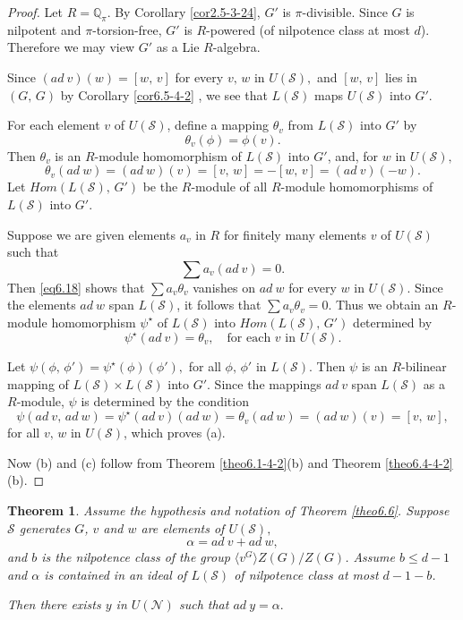\documentclass[mathscr]{amsart}
\theoremstyle{theorem}
\newtheorem{theorem}{Theorem}[section]
\theoremstyle{definition}
\numberwithin{equation}{section}
\def\Q{\mathbb{Q}}
\def\S{\mathcal{S}}
\begin{document}
\begin{proof}
Let $R=\Q_\pi$. By Corollary \ref{cor2.5-3-24}, $G'$ is
$\pi$-divisible. Since $G$ is nilpotent and $\pi$-torsion-free, $G'$
is $R$-powered (of nilpotence class at most $d$). Therefore we may
view $G'$ as a Lie $R$-algebra.

Since $(ad\ v)(w)=[w,\,v]$ for every $v,\,w$ in $U(\S),$ and
$[w,\,v]$ lies in $(G,\,G)$ by Corollary \ref{cor6.5-4-2} , we see
that $L(\S)$ maps $U(\S)$ into $G'.$

For each element $v$ of $U(\S)$, define a mapping $\theta_v$ from
$L(\S)$ into $G'$ by
$$\theta_v(\phi)=\phi(v).$$
Then $\theta_v$ is an $R$-module homomorphism of $L(\S)$ into $G'$,
and, for $w$ in $U(\S),$
\begin{equation}\label{eq6.18}
\theta_v(ad\ w)=(ad\ w)(v)=[v,\,w]=-[w,\,v]=(ad\ v)(-w).
\end{equation}
Let $Hom(L(\S),\,G')$ be the $R$-module of all $R$-module
homomorphisms of $L(\S)$ into $G'.$

Suppose we are given elements $a_v$ in $R$ for finitely many
elements $v$ of $U(\S)$ such that
$$\sum a_v(ad\ v)=0.$$
Then \eqref{eq6.18} shows that $\sum a_v\theta_v$ vanishes on $ad\
w$ for every $w$ in $U(\S)$. Since the elements $ad\ w$ span
$L(\S)$, it follows that $\sum a_v\theta_v=0$. Thus we obtain an
$R$-module homomorphism $\psi^\star$ of $L(\S)$ into
$Hom(L(\S),\,G')$ determined by
$$\psi^\star(ad\ v)=\theta_v,\quad\text{for each $v$ in }U(\S).$$

Let $\psi(\phi,\,\phi')=\psi^\star(\phi)(\phi'),$ for all
$\phi,\,\phi'$ in $L(\S).$ Then $\psi$ is an $R$-bilinear mapping of
$L(\S)\times L(\S)$ into $G'$. Since the mappings  $ad\ v$ span
$L(\S)$ as a $R$-module, $\psi$ is determined by the condition
$$\psi(ad\ v,\,ad\ w)=\psi^\star(ad\ v)(ad\ w)=\theta_v(ad\ w)=(ad\ w)(v)=[v,\,w],$$
for all $v,\,w$ in $U(\S)$, which proves (a).

Now (b) and (c) follow from Theorem \ref{theo6.1-4-2}(b) and Theorem
\ref{theo6.4-4-2}(b).
\end{proof}

\begin{theorem}\label{theo6.14}
Assume the hypothesis and notation of Theorem \ref{theo6.6}. Suppose
$\S$ generates $G$, $v$ and $w$ are elements of $U(\S),$
$$\alpha=ad\ v+ad\ w,$$
and $b$ is the nilpotence class of the group $\langle v^G\rangle
Z(G)/Z(G)$. Assume $b\leq d-1$ and $\alpha$ is contained in an ideal
of $L(\S)$ of nilpotence class at most $d-1-b$.

Then there exists $y$ in $U(\mathcal{N})$ such that $ad\ y=\alpha.$
\end{theorem}
\end{document}
